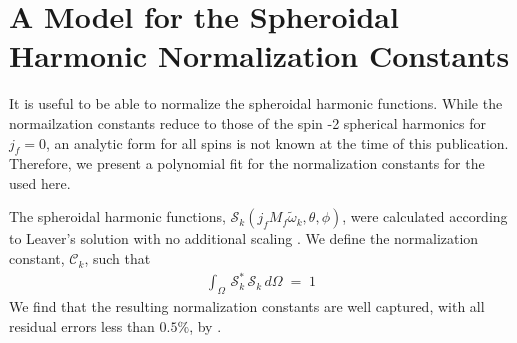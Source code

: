 \documentclass[twocolumn,prd,floatfix,preprintnumbers,a4paper,nofootinbib,superscriptaddress]{revtex4-1}
\newcommand{\cw}{\tilde{\omega}}
\def\j{j_f}
\begin{document}
%
\section{A Model for the Spheroidal Harmonic Normalization Constants}

%
It is useful to be able to normalize the spheroidal harmonic functions.
%
While the normailzation constants reduce to those of the spin -2 spherical harmonics for $\j{}=0$, an analytic form for all spins is not known at the time of this publication.
%
Therefore, we present a polynomial fit for the normalization constants for the \qnm{} used here.
%
\par The spheroidal harmonic functions, $\mathcal{S}_{k}(\j{}M_f\cw{}_k, \theta, \phi)$, were calculated according to Leaver's solution with no additional scaling \cite{Leaver85}.
%
We define the normalization constant, $\mathcal{C}_k$, such that
%
\begin{align}
	\label{eq:slm_norm}
	\int_{\Omega} \, \mathcal{S}^*_k \, \mathcal{S}_k \, d\Omega \; = \; 1
\end{align}
%
We find that the resulting normalization constants are well captured, with all residual errors less than $0.5\%$, by .
%
\begin{widetext}
	
\end{widetext}
\end{document}
